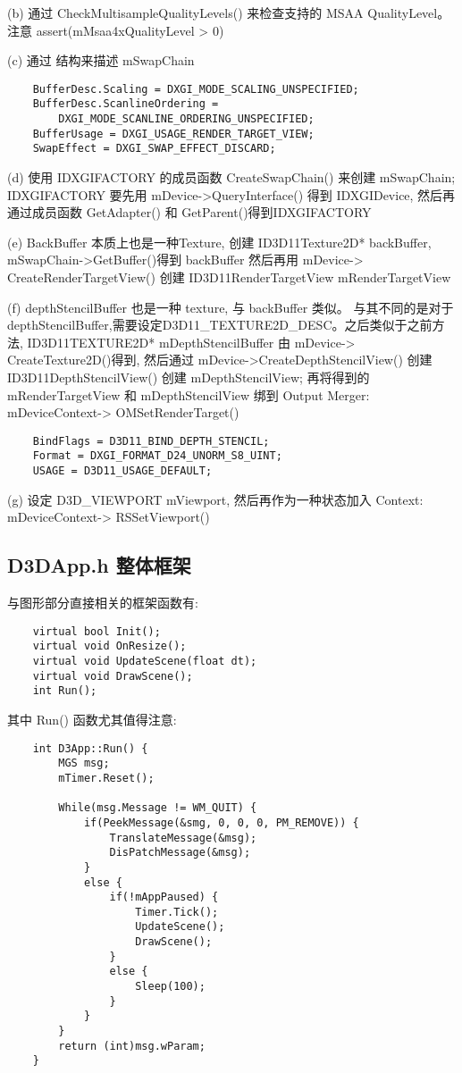\documentclass[10pt, a4paper]{article}
\begin{document}
        \quad(b) 通过 CheckMultisampleQualityLevels() 来检查支持的 MSAA QualityLevel。注意 assert(mMsaa4xQualityLevel > 0)

        \quad(c) 通过  结构来描述 mSwapChain
\begin{lstlisting}
    BufferDesc.Scaling = DXGI_MODE_SCALING_UNSPECIFIED;
    BufferDesc.ScanlineOrdering = 
        DXGI_MODE_SCANLINE_ORDERING_UNSPECIFIED;
    BufferUsage = DXGI_USAGE_RENDER_TARGET_VIEW;
    SwapEffect = DXGI_SWAP_EFFECT_DISCARD;
\end{lstlisting}

        \quad(d) 使用 IDXGIFACTORY 的成员函数 CreateSwapChain() 来创建 mSwapChain; IDXGIFACTORY 要先用 mDevice->QueryInterface() 得到 IDXGIDevice, 然后再通过成员函数 GetAdapter() 和 GetParent()得到IDXGIFACTORY 

        \quad(e) BackBuffer 本质上也是一种Texture, 创建 ID3D11Texture2D* backBuffer, mSwapChain->GetBuffer()得到 backBuffer 然后再用 mDevice-> CreateRenderTargetView() 创建 ID3D11RenderTargetView mRenderTargetView 

        \quad(f) depthStencilBuffer 也是一种 texture, 与 backBuffer 类似。 与其不同的是对于 depthStencilBuffer,需要设定D3D11\_TEXTURE2D\_DESC。之后类似于之前方法, ID3D11TEXTURE2D* mDepthStencilBuffer 由 mDevice-> CreateTexture2D()得到, 然后通过 mDevice->CreateDepthStencilView() 创建 ID3D11DepthStencilView() 创建 mDepthStencilView; 再将得到的 mRenderTargetView 和 mDepthStencilView 绑到 Output Merger: mDeviceContext-> OMSetRenderTarget()
\begin{lstlisting}
    BindFlags = D3D11_BIND_DEPTH_STENCIL;
    Format = DXGI_FORMAT_D24_UNORM_S8_UINT; 
    USAGE = D3D11_USAGE_DEFAULT;
\end{lstlisting}

        \quad(g) 设定 D3D\_VIEWPORT mViewport, 然后再作为一种状态加入 Context: mDeviceContext-> RSSetViewport()

    \subsection{D3DApp.h 整体框架}
    与图形部分直接相关的框架函数有:
\begin{lstlisting}
    virtual bool Init(); 
    virtual void OnResize(); 
    virtual void UpdateScene(float dt); 
    virtual void DrawScene(); 
    int Run();
\end{lstlisting}

    其中 Run() 函数尤其值得注意:
\begin{lstlisting}
    int D3App::Run() {
        MGS msg; 
        mTimer.Reset(); 

        While(msg.Message != WM_QUIT) {
            if(PeekMessage(&smg, 0, 0, 0, PM_REMOVE)) {
                TranslateMessage(&msg);
                DisPatchMessage(&msg);
            }
            else {
                if(!mAppPaused) {
                    Timer.Tick();
                    UpdateScene(); 
                    DrawScene();
                }
                else {
                    Sleep(100); 
                }
            }
        }
        return (int)msg.wParam;
    }
\end{lstlisting}
\end{document}
